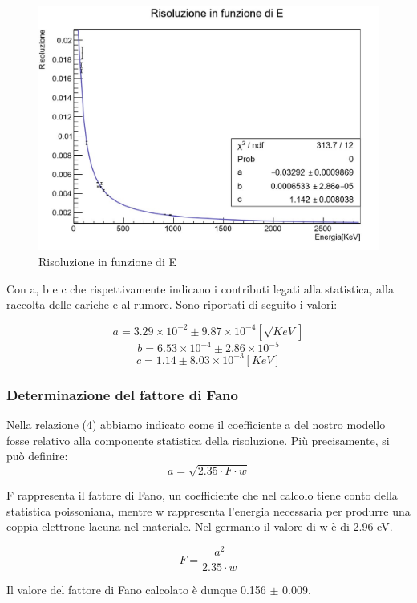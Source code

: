 \documentclass[a4paper,10pt]{article}
\begin{document}
\begin{figure}[H]
    \centering
    \includegraphics[scale=0.45]{grafici/risoluzioneignota}
    \caption{Risoluzione in funzione di E}
\end{figure}

Con a, b e c che rispettivamente indicano i contributi legati alla statistica, alla raccolta delle cariche e al rumore. Sono riportati di seguito i valori:

$$
	a=3.29 \times 10^{-2} \pm 9.87 \times 10^{-4} [\sqrt{KeV}]
$$
$$
	b=6.53 \times 10^{-4} \pm 2.86 \times 10^{-5}
$$
$$
	c= 1.14 \pm 8.03 \times 10^{-3} [KeV]
$$


\subsubsection{Determinazione del fattore di Fano}

Nella relazione (4) abbiamo indicato come il coefficiente a del nostro modello fosse relativo alla componente statistica della risoluzione. Pi\`u precisamente, si può definire:
$$
	a=\sqrt{2.35 \cdot F \cdot w}
$$

F rappresenta il fattore di Fano, un coefficiente che nel calcolo tiene conto della statistica poissoniana, mentre w rappresenta l'energia necessaria per produrre una coppia elettrone-lacuna nel materiale. Nel germanio il valore di w \`e di 2.96 eV.

$$
	F=\frac{a^2}{2.35 \cdot w}
$$

Il valore del fattore di Fano calcolato è dunque 0.156 $\pm$ 0.009.
\end{document}
